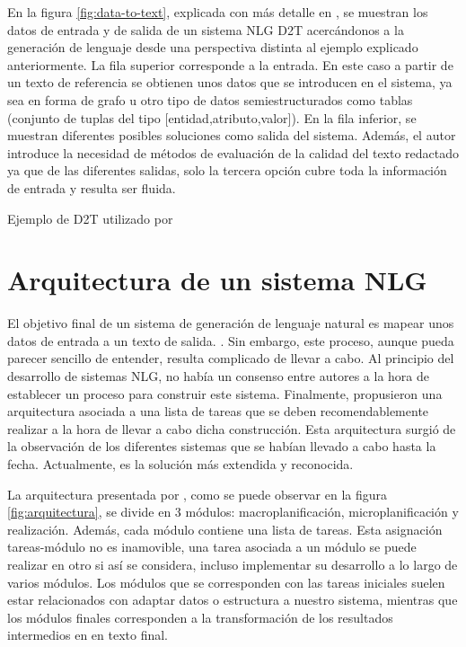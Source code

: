 En la figura \ref{fig:data-to-text}, explicada con más detalle en \cite{sai2020survey}, se muestran los datos de entrada y de salida de un sistema NLG D2T acercándonos a la generación de lenguaje desde una perspectiva distinta al ejemplo explicado anteriormente. La fila superior corresponde a la entrada. En este caso a partir de un texto de referencia se obtienen unos datos que se introducen en el sistema, ya sea en forma de grafo u otro tipo de datos semiestructurados como tablas (conjunto de tuplas del tipo [entidad,atributo,valor]). En la fila inferior, se muestran diferentes posibles soluciones como salida del sistema. Además, el autor introduce la necesidad de métodos de evaluación de la calidad del texto redactado ya que de las diferentes salidas, solo la tercera opción cubre toda la información de entrada y resulta ser fluida.

%
{Ejemplo de D2T utilizado por \cite{sai2020survey}}

\section{Arquitectura de un sistema NLG}
El objetivo final de un sistema de generación de lenguaje natural es mapear unos datos de entrada a un texto de salida. \citep{reiter1997building}. Sin embargo, este proceso, aunque pueda parecer sencillo de entender, resulta complicado de llevar a cabo. Al principio del desarrollo de sistemas NLG, no había un consenso entre autores a la hora de establecer un proceso para construir este sistema. Finalmente, \cite{reiter1997building} propusieron una arquitectura asociada a una lista de tareas que se deben recomendablemente realizar a la hora de llevar a cabo dicha construcción. Esta arquitectura surgió de la observación de los diferentes sistemas que se habían llevado a cabo hasta la fecha.  Actualmente, es la solución más extendida y reconocida.

La arquitectura presentada por \cite{reiter1997building}, como se puede observar en la figura \ref{fig:arquitectura}, se divide en 3 módulos: macroplanificación, microplanificación y realización. Además, cada módulo contiene una lista de tareas. Esta asignación tareas-módulo no es inamovible, una tarea asociada a un módulo se puede realizar en otro si así se considera, incluso implementar su desarrollo a lo largo de varios módulos. Los módulos que se corresponden con las tareas iniciales suelen estar relacionados con adaptar datos o estructura a nuestro sistema, mientras que los módulos finales corresponden a la transformación de los resultados intermedios en en texto final.

